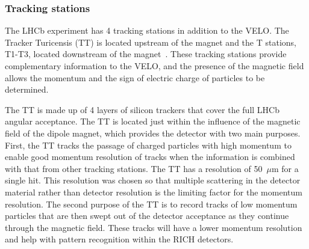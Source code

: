 


\subsubsection{Tracking stations} 
\label{Tracking_Stations}
The LHCb experiment has 4 tracking stations in addition to the VELO. The Tracker Turicensis (TT) is located upstream of the magnet and the T stations, T1-T3, located downstream of the magnet~\cite{Barbosa-Marinho:582793, Barbosa-Marinho:519146}. These tracking stations provide complementary information to the VELO, and the presence of the magnetic field allows the momentum and the sign of electric charge of particles to be determined. 



The TT is made up of 4 layers of silicon trackers that cover the full LHCb angular acceptance. The TT is located just within the influence of the magnetic field of the dipole magnet, which provides the detector with two main purposes. First, the TT tracks the passage of charged particles with high momentum to enable good momentum resolution of tracks when the information is combined with that from other tracking stations. The TT has a resolution of 50~$\mu$m for a single hit. This resolution was chosen so that multiple scattering in the detector material rather than detector resolution is the limiting factor for the momentum resolution. The second purpose of the TT is to record tracks of low momentum particles that are then swept out of the detector acceptance as they continue through the magnetic field. These tracks will have a lower momentum resolution and help with pattern recognition within the RICH detectors. 


